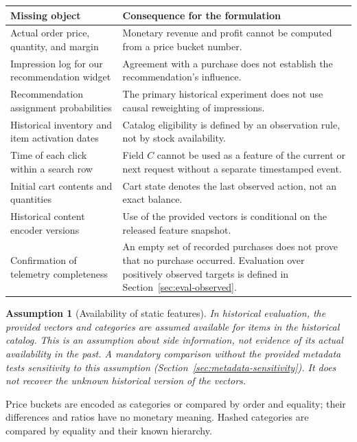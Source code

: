 \documentclass[12pt,a4paper]{article}
\theoremstyle{plainru}
\newtheorem{assumption}{Assumption}[section]
\begin{document}
\begin{longtable}{L{0.32\textwidth}L{0.60\textwidth}}
\toprule Missing object & Consequence for the formulation \\\midrule\endhead
Actual order price, quantity, and margin & Monetary
revenue and profit cannot be computed from a price bucket number. \\
Impression log for our recommendation widget & Agreement with a purchase
does not establish the recommendation's influence. \\
Recommendation assignment probabilities & The primary historical experiment
does not use causal reweighting of impressions. \\
Historical inventory and item activation dates & Catalog eligibility
is defined by an observation rule, not by stock availability. \\
Time of each click within a search row & Field \(C\) cannot be used
as a feature of the current or next request without a separate timestamped event. \\
Initial cart contents and quantities & Cart state denotes
the last observed action, not an exact balance. \\
Historical content encoder versions & Use of the provided
vectors is conditional on the released feature snapshot. \\
Confirmation of telemetry completeness & An empty set of recorded purchases
does not prove that no purchase occurred. Evaluation over positively observed
targets is defined in Section~\ref{sec:eval-observed}. \\
\bottomrule
\end{longtable}

\begin{assumption}[Availability of static features]\label{ass:static-content}
In historical evaluation, the provided vectors and categories
are assumed available for items in the historical catalog. This is an assumption
about side information, not evidence of its actual availability
in the past. A mandatory comparison without the provided metadata tests
sensitivity to this assumption (Section~\ref{sec:metadata-sensitivity}).
It does not recover the unknown historical version of the vectors.
\end{assumption}

Price buckets are encoded as categories or compared by order
and equality; their differences and ratios have no monetary meaning.
Hashed categories are compared by equality and their known hierarchy.
\end{document}
